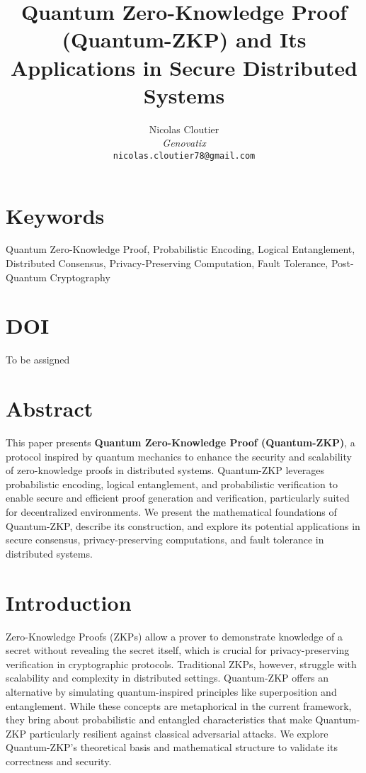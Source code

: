 \documentclass{article.cls}
\title{Quantum Zero-Knowledge Proof (Quantum-ZKP) and Its Applications in Secure Distributed Systems}
\author{Nicolas Cloutier \\
\textit{Genovatix} \\
\texttt{nicolas.cloutier78@gmail.com}}
\date{}
\begin{document}
\maketitle

\section*{Keywords}
Quantum Zero-Knowledge Proof, Probabilistic Encoding, Logical Entanglement, Distributed Consensus, Privacy-Preserving Computation, Fault Tolerance, Post-Quantum Cryptography

\section*{DOI}
To be assigned

\section*{Abstract}
This paper presents \textbf{Quantum Zero-Knowledge Proof (Quantum-ZKP)}, a protocol inspired by quantum mechanics to enhance the security and scalability of zero-knowledge proofs in distributed systems. Quantum-ZKP leverages probabilistic encoding, logical entanglement, and probabilistic verification to enable secure and efficient proof generation and verification, particularly suited for decentralized environments. We present the mathematical foundations of Quantum-ZKP, describe its construction, and explore its potential applications in secure consensus, privacy-preserving computations, and fault tolerance in distributed systems.

\section{Introduction}
Zero-Knowledge Proofs (ZKPs) allow a prover to demonstrate knowledge of a secret without revealing the secret itself, which is crucial for privacy-preserving verification in cryptographic protocols. Traditional ZKPs, however, struggle with scalability and complexity in distributed settings. Quantum-ZKP offers an alternative by simulating quantum-inspired principles like superposition and entanglement. While these concepts are metaphorical in the current framework, they bring about probabilistic and entangled characteristics that make Quantum-ZKP particularly resilient against classical adversarial attacks. We explore Quantum-ZKP’s theoretical basis and mathematical structure to validate its correctness and security.
\end{document}
